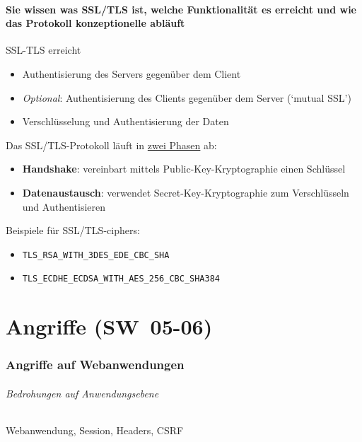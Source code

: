 \documentclass[10pt,a4paper]{article}
\begin{document}
\subsection*{Sie wissen was SSL/TLS ist, welche Funktionalität es erreicht und wie das Protokoll konzeptionelle abläuft}SSL-TLS erreicht
\begin{itemize}[noitemsep,topsep=0pt,leftmargin=*]
    \item Authentisierung des Servers gegenüber dem Client
    \item \textsl{Optional}: Authentisierung des Clients gegenüber dem Server (`mutual SSL')
    \item Verschlüsselung und Authentisierung der Daten
\end{itemize}
Das SSL/TLS-Protokoll läuft in \underline{zwei Phasen} ab:
\begin{itemize}[noitemsep,topsep=0pt,leftmargin=*]
    \item \textbf{Handshake}: vereinbart mittels Public-Key-Kryptographie einen Schlüssel
    \item \textbf{Datenaustausch}: verwendet Secret-Key-Kryptographie zum Verschlüsseln und Authentisieren
\end{itemize}
Beispiele für SSL/TLS-ciphers:
\begin{itemize}[noitemsep,topsep=0pt,leftmargin=*]
    \item \texttt{TLS\_RSA\_WITH\_3DES\_EDE\_CBC\_SHA}
    \item \texttt{TLS\_ECDHE\_ECDSA\_WITH\_AES\_256\_CBC\_SHA384}
\end{itemize}


\part{Angriffe (SW~05-06)}
\section{Angriffe auf Webanwendungen}

\paragraph*{Bedrohungen auf Anwendungsebene}Webanwendung, Session, Headers, CSRF
\end{document}
